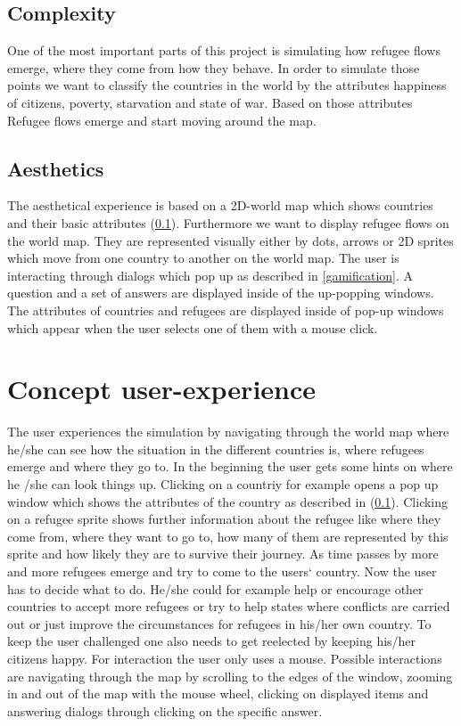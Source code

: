 \documentclass{acm_proc_article-sp}
\begin{document}
\subsection{Complexity}
\label{complexity}
One of the most important parts of this project is simulating how refugee flows emerge, where they come from how they behave. In order to simulate those points we want to classify the countries in the world by the attributes happiness of citizens, poverty, starvation and state of war. Based on those attributes Refugee flows emerge and start moving around the map.
\subsection{Aesthetics}
The aesthetical experience is based on a 2D-world map which shows countries and their basic attributes (\ref{complexity}). Furthermore we want to display refugee flows on the world map. They are represented visually  either  by dots, arrows or 2D sprites which move from one country to another on the world map. The user is interacting through dialogs which pop up as described in \ref{gamification}. A question and a set of answers are displayed inside of the up-popping windows. The attributes of countries and refugees are displayed inside of pop-up windows which appear when the user selects one of them with a mouse click.


\section{Concept user-experience}
The user experiences the simulation by navigating through the world map where he/she can see how the situation in the different countries is, where refugees emerge and where they go to. In the beginning the user gets some hints on where he /she can look things up. Clicking on a countriy for example opens a pop up window which shows the attributes of the country as described in (\ref{complexity}). Clicking on a refugee sprite shows further information about the refugee like where they come from, where they want to go to, how many of them are represented by this sprite and how likely they are to survive their journey. As time passes by more and more refugees emerge and try to come to the users` country. Now the user has to decide what to do. He/she could for example help or encourage other countries to accept more refugees or try to help states where conflicts are carried out or just improve the circumstances for refugees in his/her own country.
To keep the user challenged one also needs to get reelected by keeping his/her citizens happy. For interaction the user only uses a mouse. Possible interactions are navigating through the map by scrolling to the edges of the window, zooming in and out of the map with the mouse wheel, clicking on displayed items and answering dialogs through clicking on the specific answer.
\end{document}
